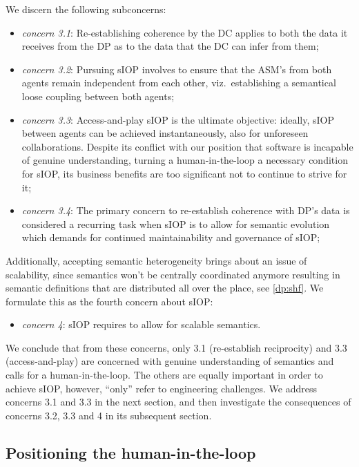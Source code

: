 \documentclass[sort&compress,preprint,authoryear,3p,twocolumn]{elsarticle}
\providecommand{\tightlist}{%
  \setlength{\itemsep}{0pt}\setlength{\parskip}{0pt}}
\begin{document}
We discern the following subconcerns:

\begin{itemize}
\tightlist
\item
  \emph{concern 3.1}: Re-establishing coherence by the DC applies to
  both the data it receives from the DP as to the data that the DC can
  infer from them;
\item
  \emph{concern 3.2}: Pursuing sIOP involves to ensure that the ASM's
  from both agents remain independent from each other, viz.~establishing
  a semantical loose coupling between both agents;
\item
  \emph{concern 3.3}: Access-and-play sIOP is the ultimate objective:
  ideally, sIOP between agents can be achieved instantaneously, also for
  unforeseen collaborations. Despite its conflict with our position that
  software is incapable of genuine understanding, turning a
  human-in-the-loop a necessary condition for sIOP, its business
  benefits are too significant not to continue to strive for it;
\item
  \emph{concern 3.4}: The primary concern to re-establish coherence with
  DP's data is considered a recurring task when sIOP is to allow for
  semantic evolution which demands for continued maintainability and
  governance of sIOP;
\end{itemize}

Additionally, accepting semantic heterogeneity brings about an issue of
scalability, since semantics won't be centrally coordinated anymore
resulting in semantic definitions that are distributed all over the
place, see \cref{dp:shf}. We formulate this as the fourth concern about
sIOP:

\begin{itemize}
\tightlist
\item
  \emph{concern 4}: sIOP requires to allow for scalable semantics.
\end{itemize}

We conclude that from these concerns, only 3.1 (re-establish
reciprocity) and 3.3 (access-and-play) are concerned with genuine
understanding of semantics and calls for a human-in-the-loop. The others
are equally important in order to achieve sIOP, however, ``only'' refer
to engineering challenges. We address concerns 3.1 and 3.3 in the next
section, and then investigate the consequences of concerns 3.2, 3.3 and
4 in its subsequent section.

\hypertarget{positioning-the-human-in-the-loop}{%
\subsection{Positioning the
human-in-the-loop}\label{positioning-the-human-in-the-loop}}
\end{document}
